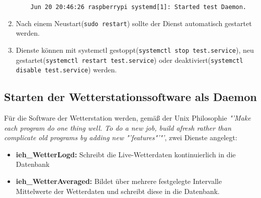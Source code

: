 \begin{enumerate}
\begin{lstlisting}
	Jun 20 20:46:26 raspberrypi systemd[1]: Started test Daemon.
	\end{lstlisting}
	
	\item Nach einem Neustart(\texttt{sudo restart}) sollte der Dienst automatisch gestartet werden.
	
	\item Dienste können mit systemctl gestoppt(\texttt{systemctl stop test.service}), neu gestartet(\texttt{systemctl restart test.service}) oder deaktiviert(\texttt{systemctl disable test.service}) werden.
\end{enumerate}

\newpage

\subsection{Starten der Wetterstationssoftware als Daemon}
Für die Software der Wetterstation werden, gemäß der Unix Philosophie \textit{"'Make each program do one thing well. To do a new job, build afresh rather than complicate old programs by adding new "'features"'"'}, zwei Dienste angelegt:
\begin{itemize}
	\item \textbf{ieh\_WetterLogd:} Schreibt die Live-Wetterdaten kontinuierlich in die Datenbank
	\item \textbf{ieh\_WetterAveraged:} Bildet über mehrere festgelegte Intervalle Mittelwerte der Wetterdaten und schreibt diese in die Datenbank.
\end{itemize}

